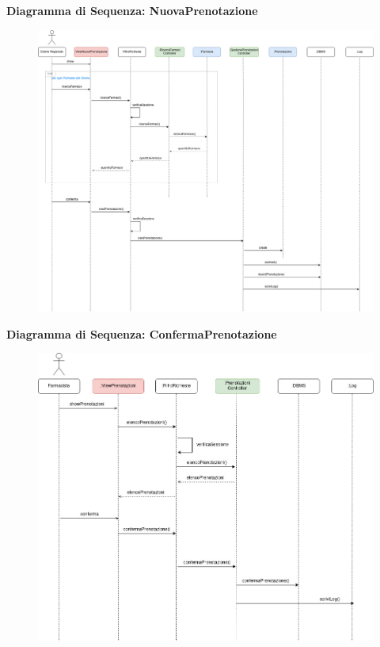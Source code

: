 \newpage

\textbf{Diagramma di Sequenza: NuovaPrenotazione}
\begin{figure}[h!]
    \begin{center}
        \includegraphics[width=\textwidth]{immagini/Interazione-NuovaPrenotazione-progettaz.jpg}
    \end{center}
\end{figure}

\newpage

\textbf{Diagramma di Sequenza: ConfermaPrenotazione}
\begin{figure}[h!]
    \begin{center}
        \includegraphics[width=\textwidth]{immagini/Interazione-ConfermaPrenotazione-progettaz.jpg}
    \end{center}
\end{figure}

